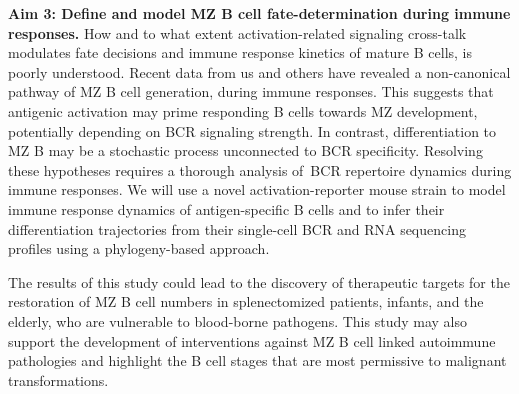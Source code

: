\documentclass[11pt]{article}
\begin{document}
\textbf{Aim 3: Define and model MZ B cell fate-determination during immune responses.} 
How and to what extent activation-related signaling cross-talk modulates fate decisions and immune response kinetics of mature B cells, is poorly understood.
Recent data from us and others have revealed a non-canonical pathway of MZ B cell generation, during immune responses.
This suggests that antigenic activation may prime responding B cells towards MZ development, potentially depending on BCR signaling strength.
In contrast, differentiation to MZ B may be a stochastic process unconnected to BCR specificity. 
Resolving these hypotheses requires a thorough analysis of BCR repertoire dynamics during immune responses. %
We will use a novel activation-reporter mouse strain to model immune response dynamics of antigen-specific B cells and to infer their differentiation trajectories from their single-cell BCR and RNA sequencing profiles using a phylogeny-based approach.


The results of this study could lead to the discovery of therapeutic targets for the restoration of MZ B cell numbers in splenectomized patients, infants, and the elderly, who are vulnerable to blood-borne pathogens.
This study may also support the development of interventions against MZ B cell linked autoimmune pathologies and highlight the B cell stages that are most permissive to malignant transformations.

\end{document}
